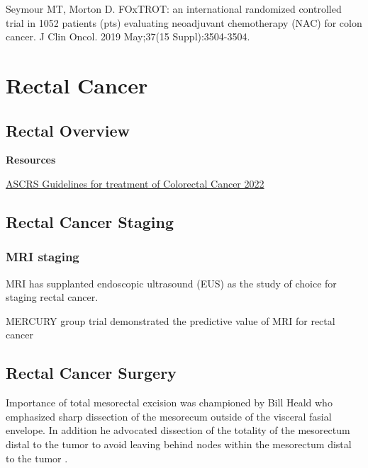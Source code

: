\documentclass[
]{book}
\begin{document}
Seymour MT, Morton D. FOxTROT: an international randomized controlled trial in 1052 patients (pts) evaluating neoadjuvant chemotherapy (NAC) for colon cancer. J Clin Oncol. 2019 May;37(15 Suppl):3504-3504.

\hypertarget{part-rectal-cancer}{%
\part*{Rectal Cancer}\label{part-rectal-cancer}}

\hypertarget{rectal-overview}{%
\chapter{Rectal Overview}\label{rectal-overview}}

\textbf{Resources}

\href{https://fascrs.org/ascrs/media/files/downloads/2022-Colon-Cancer-CPG.pdf}{ASCRS Guidelines for treatment of Colorectal Cancer 2022}

\hypertarget{rectal-cancer-staging}{%
\chapter{Rectal Cancer Staging}\label{rectal-cancer-staging}}

\hypertarget{mri-staging}{%
\section{MRI staging}\label{mri-staging}}

MRI has supplanted endoscopic ultrasound (EUS) as the study of choice for staging rectal cancer.

MERCURY group trial demonstrated the predictive value of MRI for rectal cancer\citep{taylor34} \citep{mercurystudygroup779}

\hypertarget{rectal-cancer-surgery}{%
\chapter{Rectal Cancer Surgery}\label{rectal-cancer-surgery}}

Importance of total mesorectal excision was championed by Bill Heald \citep{heald1479} who emphasized sharp dissection of the mesorecum outside of the visceral fasial envelope. In addition he advocated dissection of the totality of the mesorectum distal to the tumor to avoid leaving behind nodes within the mesorectum distal to the tumor\citep{quirke996} \citep{nagtegaal303} \citep{paty365}.
\end{document}
